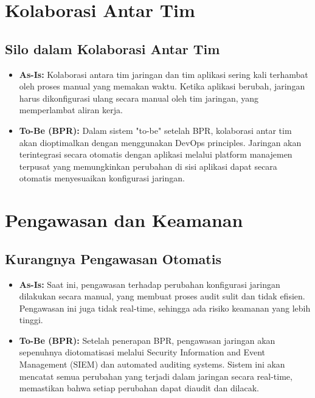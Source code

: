\section{Kolaborasi Antar Tim}

\subsection{Silo dalam Kolaborasi Antar Tim}
\begin{itemize}
    \item \textbf{As-Is:} Kolaborasi antara tim jaringan dan tim aplikasi sering kali terhambat oleh proses manual yang memakan waktu. Ketika aplikasi berubah, jaringan harus dikonfigurasi ulang secara manual oleh tim jaringan, yang memperlambat aliran kerja.
    
    \item \textbf{To-Be (BPR):} Dalam sistem "to-be" setelah BPR, kolaborasi antar tim akan dioptimalkan dengan menggunakan DevOps principles. Jaringan akan terintegrasi secara otomatis dengan aplikasi melalui platform manajemen terpusat yang memungkinkan perubahan di sisi aplikasi dapat secara otomatis menyesuaikan konfigurasi jaringan.
\end{itemize}

\section{Pengawasan dan Keamanan}

\subsection{Kurangnya Pengawasan Otomatis}
\begin{itemize}
    \item \textbf{As-Is:} Saat ini, pengawasan terhadap perubahan konfigurasi jaringan dilakukan secara manual, yang membuat proses audit sulit dan tidak efisien. Pengawasan ini juga tidak real-time, sehingga ada risiko keamanan yang lebih tinggi.
    
    \item \textbf{To-Be (BPR):} Setelah penerapan BPR, pengawasan jaringan akan sepenuhnya diotomatisasi melalui Security Information and Event Management (SIEM) dan automated auditing systems. Sistem ini akan mencatat semua perubahan yang terjadi dalam jaringan secara real-time, memastikan bahwa setiap perubahan dapat diaudit dan dilacak.
\end{itemize}

